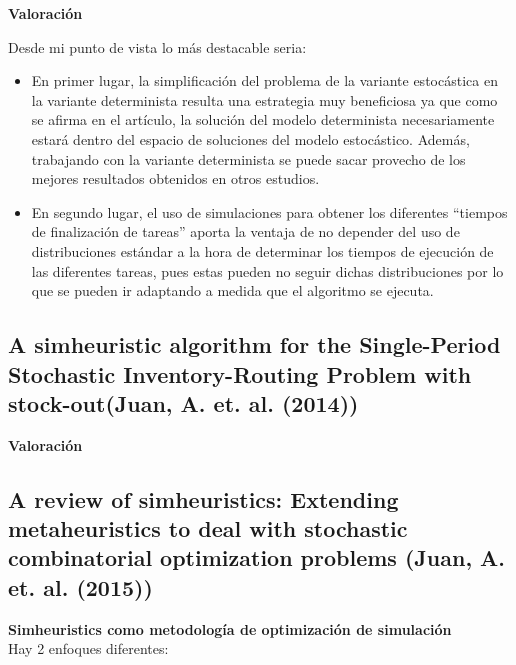 \documentclass[11pt]{article} %
\begin{document}
\textbf{Valoración}

Desde mi punto de vista lo más destacable seria:
\begin{itemize}
\item En primer lugar, la simplificación del problema de la variante estocástica en la variante determinista resulta una estrategia muy beneficiosa ya que como se afirma en el artículo, la solución del modelo determinista necesariamente estará dentro del espacio de soluciones del modelo estocástico. Además, trabajando con la variante determinista se puede sacar provecho de los mejores resultados obtenidos en otros estudios. 
\item En segundo lugar, el uso de simulaciones para obtener los diferentes “tiempos de finalización de tareas” aporta la ventaja de no depender del uso de distribuciones estándar a la hora de determinar los tiempos de ejecución de las diferentes tareas, pues estas pueden no seguir dichas distribuciones por lo que se pueden ir adaptando a medida que el algoritmo se ejecuta.
\end{itemize}

\subsection{A simheuristic algorithm for the Single-Period Stochastic Inventory-Routing Problem with stock-out(Juan, A. et. al. (2014))}


\textbf{Valoración}\\[0.2cm]


\subsection{A review of simheuristics: Extending metaheuristics to deal with stochastic combinatorial optimization problems (Juan, A. et. al. (2015))}

\textbf{Simheuristics como metodología de optimización de simulación}\\[0.2cm]
Hay 2 enfoques diferentes:
\end{document}

